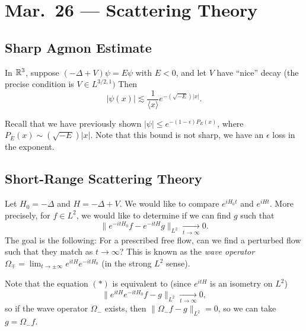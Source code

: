 \chapter{Mar.~26 --- Scattering Theory}

\section{Sharp Agmon Estimate}
\begin{theorem}
  In $\mathbb{R}^3$, suppose $(-\Delta + V) \psi = E\psi$ with
  $E < 0$, and
  let $V$ have ``nice'' decay (the precise
  condition is $V \in L^{3 / 2, 1})$ Then
  \[
    |\psi(x)| \lesssim \frac{1}{\langle x \rangle} e^{-(\sqrt{-E}) |x|}.
  \]
\end{theorem}

\begin{remark}
  Recall that we have previously shown
  $|\psi| \le e^{-(1 - \epsilon) P_E(x)}$, where
  $P_E(x) \sim (\sqrt{-E}) |x|$. Note that this
  bound is not sharp, we have an $\epsilon$ loss
  in the exponent.
\end{remark}

\section{Short-Range Scattering Theory}

\begin{remark}
  Let $H_0 = -\Delta$ and $H = -\Delta + V$.
  We would like to compare $e^{i H_0 t}$ and $e^{i H t}$.
  More precisely, for $f \in L^2$,
  we would like to determine if we can  find
  $g$ such that
  \[
    \|e^{-itH_0} f - e^{-itH} g\|_{L^2} \xrightarrow[t \to \infty]{} 0. \tag{$*$}
  \]
  The goal is the following: For a prescribed free flow,
  can we find a perturbed flow such that they match as
  $t \to \infty$? This is known as the
  \emph{wave operator}
  $\Omega_{\mp} = \lim_{t \to \pm \infty} e^{itH} e^{-itH_0}$
  (in the strong $L^2$ sense).

  Note that the equation $(*)$ is equivalent to (since
  $e^{itH}$ is an isometry on $L^2$)
  \[
    \|e^{itH} e^{-i t H_0} f - g\|_{L^2} \xrightarrow[t \to \infty]{} 0,
  \]
  so if the wave operator $\Omega_-$ exists,
  then $\|\Omega_- f - g\|_{L^2} = 0$, so
  we can take $g = \Omega_- f$.
\end{remark}

